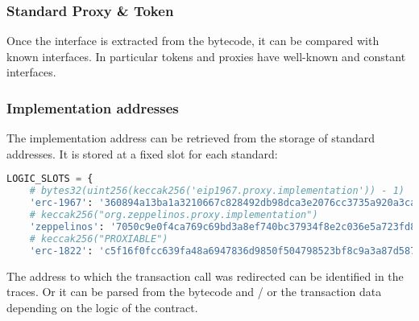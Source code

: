 \subsubsection{Standard Proxy \& Token}

Once the interface is extracted from the bytecode, it can be compared with known interfaces.
In particular tokens and proxies have well-known and constant interfaces.

\subsubsection{Implementation addresses}

The implementation address can be retrieved from the storage of standard addresses.
It is stored at a fixed slot for each standard:

\begin{lstlisting}[language=Python]
LOGIC_SLOTS = {
    # bytes32(uint256(keccak256('eip1967.proxy.implementation')) - 1)
    'erc-1967': '360894a13ba1a3210667c828492db98dca3e2076cc3735a920a3ca505d382bbc',
    # keccak256("org.zeppelinos.proxy.implementation")
    'zeppelinos': '7050c9e0f4ca769c69bd3a8ef740bc37934f8e2c036e5a723fd8ee048ed3f8c3',
    # keccak256("PROXIABLE")
    'erc-1822': 'c5f16f0fcc639fa48a6947836d9850f504798523bf8c9a3a87d5876cf622bcf7',}
\end{lstlisting}

The address to which the transaction call was redirected can be identified in the traces.
Or it can be parsed from the bytecode and / or the transaction data depending on the logic of the contract.
